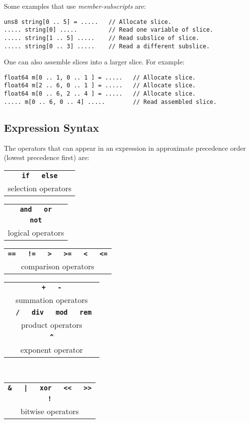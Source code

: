 \documentclass[12pt]{article}
\newcommand{\TT}[1]{{\tt \bfseries #1}}
\newenvironment{indpar}[1][0.3in]%
	{\begin{list}{}%
		     {\setlength{\itemsep}{0in}%
		      \setlength{\topsep}{0in}%
		      \setlength{\parsep}{1ex}%
		      \setlength{\labelwidth}{#1}%
		      \setlength{\leftmargin}{#1}%
		      \addtolength{\leftmargin}{\labelsep}}%
	 \item}%
	{\end{list}}
\begin{document}
Some examples that use {\em member-subscripts} are:\label{SLICE}
\begin{indpar}\begin{verbatim}
uns8 string[0 .. 5] = .....   // Allocate slice.
..... string[0] .....         // Read one variable of slice.
..... string[1 .. 5] .....    // Read subslice of slice.
..... string[0 .. 3] .....    // Read a different subslice.
\end{verbatim}\end{indpar}

One can also assemble slices into a larger slice.  For example:
\begin{indpar}\begin{verbatim}
float64 m[0 .. 1, 0 .. 1 ] = .....   // Allocate slice.
float64 m[2 .. 6, 0 .. 1 ] = .....   // Allocate slice.
float64 m[0 .. 6, 2 .. 4 ] = .....   // Allocate slice.
..... m[0 .. 6, 0 .. 4] .....        // Read assembled slice.
\end{verbatim}\end{indpar}

\subsection{Expression Syntax}
\label{EXPRESSION-SYNTAX}

The operators that can appear in an expression in approximate
precedence order (lowest precedence first) are:

\begin{center}

\begin{tabular}{c}
\TT{if ~ else} \\
selection operators
\end{tabular}

\medskip

\begin{tabular}{c}
\TT{and ~ or} \\
\TT{not} \\
logical operators
\end{tabular}

\medskip

\begin{tabular}{c}
\TT{== ~ != ~ > ~ >= ~ < ~ <=} \\
comparison operators
\end{tabular}

\medskip

\begin{tabular}[t]{c}
\TT{+ ~ -} \\
summation operators
\\[2ex]
\TT{* ~ / ~ div ~ mod ~ rem } \\
product operators
\\[2ex]
\TT{\textasciicircum} \\
exponent operator
\end{tabular}
~~~~~
\begin{tabular}[t]{c}
\TT{\& ~ | ~ xor ~ <{}< ~ >{}>} \\
\TT{!} \\
bitwise operators
\end{tabular}

\end{center}
\end{document}
